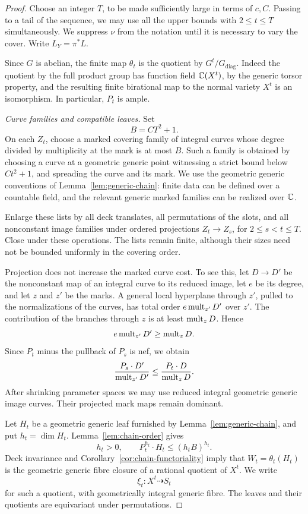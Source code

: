 \begin{proof}
Choose an integer \(T\), to be made sufficiently large in terms of
\(c,C\).  Passing to a tail of the sequence, we may use all the upper
bounds with \(2\le t\le T\) simultaneously.  We suppress \(\nu\)
from the notation until it is necessary to vary the cover.  Write
\(L_Y=\pi^*L\).

Since \(G\) is abelian, the finite map \(\theta_t\) is the quotient
by \(G^t/G_{\mathrm{diag}}\).  Indeed the quotient by the full product
group has function field \(\mathbb C(X^t)\), by the generic torsor property,
and the resulting finite birational map to the normal variety \(X^t\)
is an isomorphism.  In particular, \(P_t\) is ample.

\medskip\noindent
\emph{Curve families and compatible leaves.}
Set
\[
 B=CT^2+1.
\]
On each \(Z_t\), choose a marked covering family of integral curves
whose degree divided by multiplicity at the mark is at most \(B\).
Such a family is obtained by choosing a curve at a geometric generic
point witnessing a strict bound below \(Ct^2+1\), and spreading the
curve and its mark.  We use the geometric generic conventions of
Lemma~\ref{lem:generic-chain}: finite data can be defined over a
countable field, and the relevant generic marked families can be
realized over \(\mathbb C\).

Enlarge these lists by all deck translates, all permutations of the
slots, and all nonconstant image families under ordered projections
\(Z_t\to Z_s\), for \(2\le s<t\le T\).  Close under these
operations.  The lists remain finite, although their sizes need not be
bounded uniformly in the covering order.

Projection does not increase the marked curve cost.  To see this, let
\(D\to D'\) be the nonconstant map of an integral curve to its reduced
image, let \(e\) be its degree, and let \(z\) and \(z'\) be the marks.
A general local hyperplane through \(z'\), pulled to the normalizations
of the curves, has total order
\(e\operatorname{mult}_{z'}D'\) over \(z'\).  The contribution of the branches
through \(z\) is at least \(\operatorname{mult}_zD\).  Hence
\[
 e\operatorname{mult}_{z'}D'\ge\operatorname{mult}_zD.
\]
Since \(P_t\) minus the pullback of \(P_s\) is nef, we obtain
\[
 \frac{P_s\cdot D'}{\operatorname{mult}_{z'}D'}
 \le
 \frac{P_t\cdot D}{\operatorname{mult}_zD}.
\]
After shrinking parameter spaces we may use reduced integral geometric
generic image curves.  Their projected mark maps remain dominant.

Let \(H_t\) be a geometric generic leaf furnished by
Lemma~\ref{lem:generic-chain}, and put \(h_t=\dim H_t\).
Lemma~\ref{lem:chain-order} gives
\begin{equation}\label{eq:transport-chain-degree}
  h_t>0,\qquad P_t^{h_t}\cdot H_t\le(h_tB)^{h_t}.
\end{equation}
Deck invariance and Corollary~\ref{cor:chain-functoriality} imply that
\(W_t=\theta_t(H_t)\) is the geometric generic fibre closure of a
rational quotient of \(X^t\).  We write
\[
 \xi_t:X^t\dashrightarrow S_t
\]
for such a quotient, with geometrically integral generic fibre.
The leaves and their quotients are equivariant under permutations.


\end{proof}
